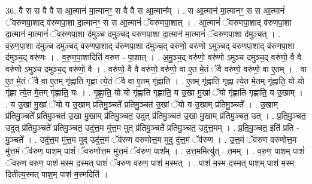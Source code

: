 \documentclass[17pt]{extarticle}
\begin{document}
36. वै स स वै वै स आ॒त्मान॑ मा॒त्मानꣳ॒॒ स वै वै स आ॒त्मान᳚म् । . स आ॒त्मान॑ मा॒त्मानꣳ॒॒ स स आ॒त्मानं॑ ॅवरुणपा॒शाद् व॑रुणपा॒शा दा॒त्मानꣳ॒॒ स स आ॒त्मानं॑ ॅवरुणपा॒शात् । . आ॒त्मानं॑ ॅवरुणपा॒शाद् व॑रुणपा॒शा दा॒त्मान॑ मा॒त्मानं॑ ॅवरुणपा॒शा द॑मुञ्च दमुञ्चद् वरुणपा॒शा दा॒त्मान॑ मा॒त्मानं॑ ॅवरुणपा॒शा द॑मुञ्चत् । . व॒रु॒ण॒पा॒शा द॑मुञ्च दमुञ्चद् वरुणपा॒शाद् व॑रुणपा॒शा द॑मुञ्च॒द् वरु॑णो॒ वरु॑णो ऽमुञ्चद् वरुणपा॒शाद् व॑रुणपा॒शा द॑मुञ्च॒द् वरु॑णः । . व॒रु॒ण॒पा॒शादिति॑ वरुण - पा॒शात् । . अ॒मु॒ञ्च॒द् वरु॑णो॒ वरु॑णो ऽमुञ्च दमुञ्च॒द् वरु॑णो॒ वै वै वरु॑णो ऽमुञ्च दमुञ्च॒द् वरु॑णो॒ वै । . वरु॑णो॒ वै वै वरु॑णो॒ वरु॑णो॒ वा ए॒त मे॒तं ॅवै वरु॑णो॒ वरु॑णो॒ वा ए॒तम् । . वा ए॒त मे॒तं ॅवै वा ए॒तम् गृ॑ह्णाति गृह्णा त्ये॒तं ॅवै वा ए॒तम् गृ॑ह्णाति । . ए॒तम् गृ॑ह्णाति गृह्णा त्ये॒त मे॒तम् गृ॑ह्णाति॒ यो यो गृ॑ह्णा त्ये॒त मे॒तम् गृ॑ह्णाति॒ यः । . गृ॒ह्णा॒ति॒ यो यो गृ॑ह्णाति गृह्णाति॒ य उ॒खा मु॒खां ॅयो गृ॑ह्णाति गृह्णाति॒ य उ॒खाम् । . य उ॒खा मु॒खां ॅयो य उ॒खाम् प्र॑तिमु॒ञ्चते᳚ प्रतिमु॒ञ्चत॑ उ॒खां ॅयो य उ॒खाम् प्र॑तिमु॒ञ्चते᳚ । . उ॒खाम् प्र॑तिमु॒ञ्चते᳚ प्रतिमु॒ञ्चत॑ उ॒खा मु॒खाम् प्र॑तिमु॒ञ्चत॒ उदुत् प्र॑तिमु॒ञ्चत॑ उ॒खा मु॒खाम् प्र॑तिमु॒ञ्चत॒ उत् । . प्र॒ति॒मु॒ञ्चत॒ उदुत् प्र॑तिमु॒ञ्चते᳚ प्रतिमु॒ञ्चत॒ उदु॑त्त॒म मु॑त्त॒म मुत् प्र॑तिमु॒ञ्चते᳚ प्रतिमु॒ञ्चत॒ उदु॑त्त॒मम् । . प्र॒ति॒मु॒ञ्चत॒ इति॑ प्रति - मु॒ञ्चते᳚ । . उदु॑त्त॒म मु॑त्त॒म मुद् उदु॑त्त॒मं ॅव॑रुण वरुणोत्त॒म मुदु दु॑त्त॒मं ॅव॑रुण । . उ॒त्त॒मं ॅव॑रुण वरुणोत्त॒म मु॑त्त॒मं ॅव॑रुण॒ पाश॒म् पाशं॑ ॅवरुणोत्त॒म मु॑त्त॒मं ॅव॑रुण॒ पाश᳚म् । . उ॒त्त॒ममित्यु॑त् - त॒मम् । . व॒रु॒ण॒ पाश॒म् पाशं॑ ॅवरुण वरुण॒ पाश॑ म॒स्म द॒स्मत् पाशं॑ ॅवरुण वरुण॒ पाश॑ म॒स्मत् । . पाश॑ म॒स्म द॒स्मत् पाश॒म् पाश॑ म॒स्म दितीत्य॒स्मत् पाश॒म् पाश॑ म॒स्मदिति॑ । \newline
\end{document}
